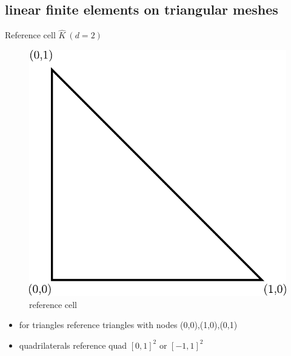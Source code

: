 \documentclass[english]{article}
\theoremstyle{definition}
\theoremstyle{remark}
\begin{document}
\subsection{linear finite elements on triangular meshes}
Reference cell $\hat K \ (d=2)$
\begin{figure}[tbh]
  \begin{center}
    \includegraphics[width=\textwidth]{figs/referenceCell.pdf}
  \end{center}
  \caption{reference cell}
  \label{reference-cell-figure}
\end{figure}
\begin{itemize}
\item for triangles reference triangles with nodes (0,0),(1,0),(0,1)
\item quadrilaterals reference quad $[0,1]^2$ or $[-1,1]^2$
\end{itemize}
\end{document}
